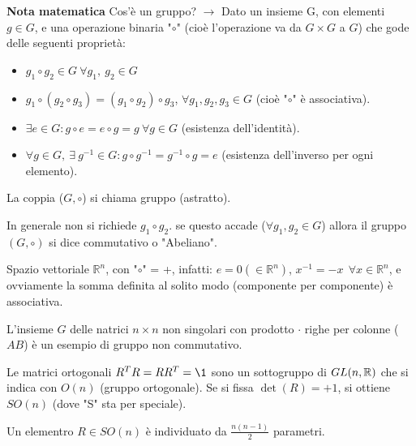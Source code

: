 \documentclass[Main.tex]{subfiles}
\begin{document}
	\begin{adjustwidth}{1cm}{}
	\begin{mdframed}[linewidth=1.5,linecolor=purple, topline=false,rightline=false,bottomline=false]
	\textbf{Nota matematica} 
	\newline Cos'è un gruppo? $\rightarrow$ Dato un insieme G, con elementi $g \in G$, e una operazione binaria "$\circ$" (cioè l'operazione va da $G \times G$ a $G$) che gode delle seguenti proprietà:
	\begin{itemize}
	\item $g_1 \circ g_2 \in G \ \forall g_1, \ g_2 \in G$ 
	\item $g_1 \circ (g_2 \circ g_3) = (g_1 \circ g_2)\circ g_3$, $\forall g_1, g_2, g_3 \in G$ (cioè "$\circ$" è associativa).
	\item $\exists e  \in G : g \circ e = e \circ g =g \ \forall g \in G$ (esistenza dell'identità).
	\item $\forall g \in G, \ \exists \ g^{-1} \in G : g \circ g^{-1} = g^{-1} \circ g = e$ (esistenza dell'inverso per ogni elemento).
	\end{itemize}
	La coppia ($G, \circ$) si chiama gruppo (astratto).

	\begin{osservazione}
		In generale non si richiede $g_1 \circ g_2$. se questo accade ($\forall g_1, g_2 \in G$) allora il gruppo $(G, \circ)$ si dice commutativo o "Abeliano".
	\end{osservazione}
	\begin{esempio} Spazio vettoriale $\mathbb{R}^n$, con "$\circ$" = +, infatti: $e= 0(\in \mathbb{R}^n )$, $x^{-1} = -x \  \  \forall x \in \mathbb{R}^n $, e ovviamente la somma definita al solito modo (componente per componente) è associativa.
	\end{esempio}
	\begin{esempio}
		L'insieme $G$ delle natrici $n \times n$ non singolari con prodotto $\cdot$ righe per colonne ($AB$) è un esempio di gruppo non commutativo.
	\end{esempio}
	\begin{esempio}
		Le matrici ortogonali $R^TR = RR^T= \1$ sono un sottogruppo di $GL(n , \mathbb{R})$ che si indica con $O(n)$ (gruppo ortogonale). Se si fissa $\det(R) = +1$, si ottiene $SO(n)$ (dove "S" sta per speciale).
		
		Un elementro $R \in SO(n)$ è individuato da $\frac{n(n-1)}{2}$ parametri.
	\end{esempio}
	\end{mdframed}
	\end{adjustwidth}
\end{document}
